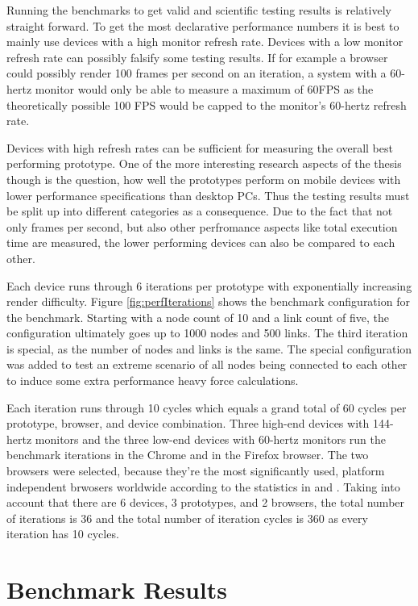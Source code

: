 Running the benchmarks to get valid and scientific testing results is relatively straight forward. To get the most declarative performance numbers it is best to mainly use devices with a high monitor refresh rate. Devices with a low monitor refresh rate can possibly falsify some testing results. If for example a browser could possibly render 100 frames per second on an iteration, a system with a 60-hertz monitor would only be able to measure a maximum of 60FPS as the theoretically possible 100 FPS would be capped to the monitor's 60-hertz refresh rate.

Devices with high refresh rates can be sufficient for measuring the overall best performing prototype. One of the more interesting research aspects of the thesis though is the question, how well the prototypes perform on mobile devices with lower performance specifications than desktop PCs. Thus the testing results must be split up into different categories as a consequence. Due to the fact that not only frames per second, but also other perfromance aspects like total execution time are measured, the lower performing devices can also be compared to each other.

Each device runs through 6 iterations per prototype with exponentially increasing render difficulty. Figure \ref{fig:perfIterations} shows the benchmark configuration for the benchmark. Starting with a node count of 10 and a link count of five, the configuration ultimately goes up to 1000 nodes and 500 links. The third iteration is special, as the number of nodes and links is the same. The special configuration was added to test an extreme scenario of all nodes being connected to each other to induce some extra performance heavy force calculations.

Each iteration runs through 10 cycles which equals a grand total of 60 cycles per prototype, browser, and device combination. Three high-end devices with 144-hertz monitors and the three low-end devices with 60-hertz monitors run the benchmark iterations in the Chrome and in the Firefox browser. The two browsers were selected, because they're the most significantly used, platform independent brwosers worldwide according to the statistics in \cite{StatCounterBrowserMarketShare} and \cite{W3CBrowserMarketShare}. Taking into account that there are 6 devices, 3 prototypes, and 2 browsers, the total number of iterations is 36 and the total number of iteration cycles is 360 as every iteration has 10 cycles.

\section{Benchmark Results}

